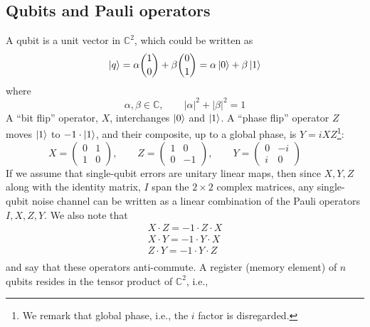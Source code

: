 \subsection{Qubits and Pauli operators\label{qubits}}
A qubit is a unit vector in \(\mathbb{C}^2\), which could be written as 
\begin{equation}
\begin{split}
|q\rangle = \alpha\binom{1}{0} + \beta\binom{0}{1} 
= \alpha\ket{0} + \beta\ket{1}
\end{split}
\end{equation}
where
\begin{equation}
\alpha,\beta \in \mathbb{C},\qquad |\alpha|^2 + |\beta|^2 = 1  
\end{equation}
A ``bit flip'' operator, \(X\), interchanges \(\ket{0}\) and \(\ket{1}\). A ``phase flip'' operator \(Z\) moves \(\ket{1}\) to \(-1\cdot \ket{1}\), and their composite, up to a global phase, is \(Y = iXZ\)\footnote{We remark that global phase, i.e., the \(i\) factor is disregarded.}:
\begin{equation}
X = \begin{pmatrix}0&1\\1&0\end{pmatrix}, \qquad
    Z = \begin{pmatrix}1&0\\0&-1\end{pmatrix}, \qquad 
    Y = \begin{pmatrix}0&-i\\i&0\end{pmatrix} \qquad
\end{equation}
If we assume that single-qubit errors are unitary linear maps, then %
since \(X, Y, Z\) along with the identity matrix, \(I\) span the \(2\times 2\) complex matrices, any single-qubit noise channel can be written as a linear combination of the Pauli operators \(I,X,Z,Y\).
We also note that 
\begin{equation}
\begin{split}
    X\cdot Z = -1\cdot Z \cdot X\\
    X\cdot Y = -1\cdot Y \cdot X\\
    Z\cdot Y = -1\cdot Y \cdot Z\\
\end{split}
\end{equation}
and say that these operators anti-commute. A register (memory element) of \(n\) qubits resides in the tensor product of \(\mathbb{C}^2\), i.e., 
